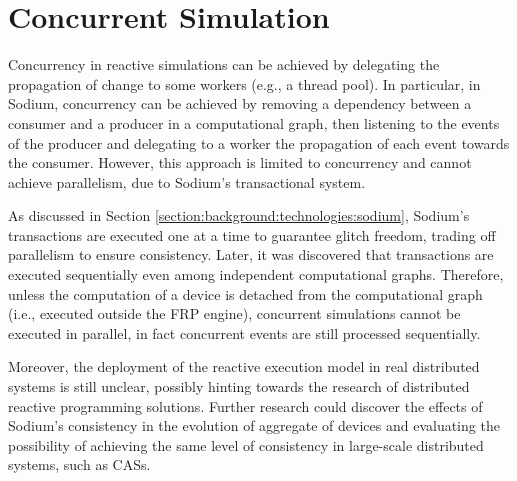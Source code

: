 \section{Concurrent Simulation}
\label{section:design:concurrent-simulation}

Concurrency in reactive simulations can be achieved by delegating the
propagation of change to some workers (e.g., a thread pool). In particular, in
Sodium, concurrency can be achieved by removing a dependency between a consumer
and a producer in a computational graph, then listening to the events of the
producer and delegating to a worker the propagation of each event towards the
consumer. However, this approach is limited to concurrency and cannot achieve
parallelism, due to Sodium's transactional system.

As discussed in Section \ref{section:background:technologies:sodium}, Sodium's
transactions are executed one at a time to guarantee glitch freedom, trading
off parallelism to ensure consistency. Later, it was discovered that
transactions are executed sequentially even among independent computational
graphs. Therefore, unless the computation of a device is detached from the
computational graph (i.e., executed outside the FRP engine), concurrent
simulations cannot be executed in parallel, in fact concurrent events are still
processed sequentially.

Moreover, the deployment of the reactive execution model in real distributed
systems is still unclear, possibly hinting towards the research of distributed
reactive programming solutions. Further research could discover the effects of
Sodium's consistency in the evolution of aggregate of devices and evaluating
the possibility of achieving the same level of consistency in large-scale
distributed systems, such as \ac{CAS}s.
